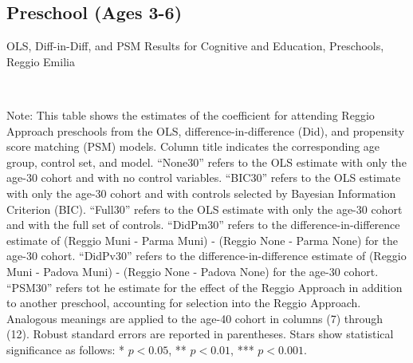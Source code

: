 \begin{landscape}
\subsection{Preschool (Ages 3-6)}

\begin{table}[H] \caption{OLS, Diff-in-Diff, and PSM Results for Cognitive and Education, Preschools, Reggio Emilia} \label{ols-E-reg}
\scalebox{0.80}{}
\vspace{1ex} \\
\footnotesize\raggedright{Note: This table shows the estimates of the coefficient for attending Reggio Approach preschools from the OLS, difference-in-difference (Did), and propensity score matching (PSM) models. Column title indicates the corresponding age group, control set, and model. ``None30'' refers to the OLS estimate with only the age-30 cohort and with no control variables. ``BIC30'' refers to the OLS estimate with only the age-30 cohort and with controls selected by Bayesian Information Criterion (BIC). ``Full30'' refers to the OLS estimate with only the age-30 cohort and with the full set of controls. ``DidPm30'' refers to the difference-in-difference estimate of (Reggio Muni - Parma Muni) - (Reggio None - Parma None) for the age-30 cohort. ``DidPv30'' refers to the difference-in-difference estimate of (Reggio Muni - Padova Muni) - (Reggio None - Padova None) for the age-30 cohort. ``PSM30'' refers tot he estimate for the effect of the Reggio Approach in addition to another preschool, accounting for selection into the Reggio Approach. Analogous meanings are applied to the age-40 cohort in columns (7) through (12). Robust standard errors are reported in parentheses. Stars show statistical significance as follows: * $p < 0.05$, ** $p < 0.01$, *** $p < 0.001$.}
\end{table}



\end{landscape}
